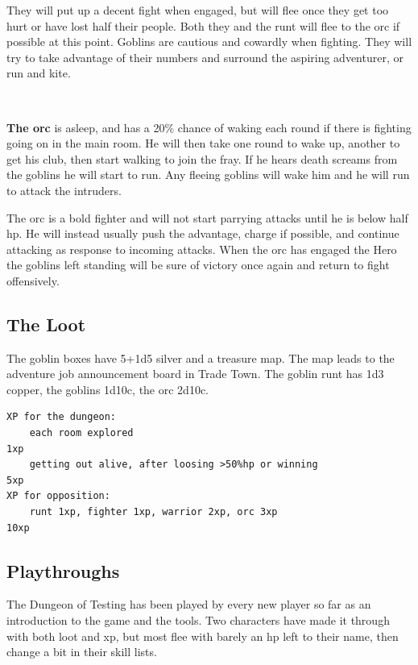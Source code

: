 They will put up a decent fight when engaged, but will flee once they get too hurt or have lost half their people. Both they and the runt will flee to the orc if possible at this point.
Goblins are cautious and cowardly when fighting. They will try to take advantage of their numbers and surround the aspiring adventurer, or run and kite.

\

\textbf{The orc} is asleep, and has a 20\% chance of waking each round if there is fighting going on in the main room. He will then take one round to wake up, another to get his club, then start walking to join the fray. If he hears death screams from the goblins he will start to run. Any fleeing goblins will wake him and he will run to attack the intruders. 

The orc is a bold fighter and will not start parrying attacks until he is below half hp. He will instead usually push the advantage, charge if possible, and continue attacking as response to incoming attacks.
When the orc has engaged the Hero the goblins left standing will be sure of victory once again and return to fight offensively.


\subsection*{The Loot}

The goblin boxes have 5+1d5 silver and a treasure map. The map leads to the adventure job announcement board in Trade Town. The goblin runt has 1d3 copper, the goblins 1d10c, the orc 2d10c.\\
\begin{samepage} \small \begin{verbatim}
XP for the dungeon:
    each room explored                                                     1xp
    getting out alive, after loosing >50%hp or winning                     5xp
XP for opposition:
    runt 1xp, fighter 1xp, warrior 2xp, orc 3xp                           10xp
\end{verbatim} \end{samepage} \normalsize


\subsection*{Playthroughs}

The Dungeon of Testing has been played by every new player so far as an introduction to the game and the tools. Two characters have made it through with both loot and xp, but most flee with barely an hp left to their name, then change a bit in their skill lists.

